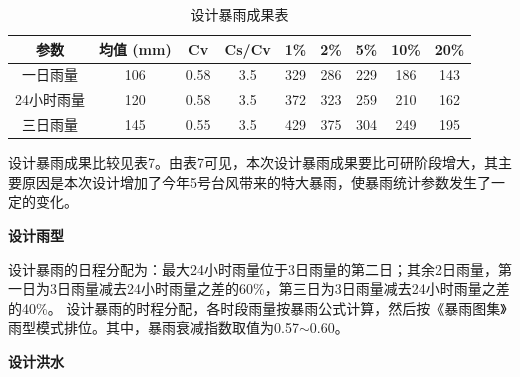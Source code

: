 \documentclass[UTF8, a4paper, 12pt]{ctexart} %
\begin{document}
\begin{table}[h]
    \centering
    \caption{设计暴雨成果表}
    \begin{tabular}{|c|c|c|c|c|c|c|c|c|}
        \hline
        参数 & 均值 (mm) & Cv & Cs/Cv & 1\% & 2\% & 5\% & 10\% & 20\% \\ \hline
        一日雨量 & 106 & 0.58 & 3.5 & 329 & 286 & 229 & 186 & 143 \\ \hline
        24小时雨量 & 120 & 0.58 & 3.5 & 372 & 323 & 259 & 210 & 162 \\ \hline
        三日雨量 & 145 & 0.55 & 3.5 & 429 & 375 & 304 & 249 & 195 \\ \hline
    \end{tabular}
    \label{tab:design_rainfall_results}
\end{table}
设计暴雨成果比较见表7。由表7可见，本次设计暴雨成果要比可研阶段增大，其主要原因是本次设计增加了今年5号台风带来的特大暴雨，使暴雨统计参数发生了一定的变化。
\begin{table}[h]
    \centering
    \caption{设计暴雨成果比较表}
    \label{tab:design_rainfall_comparison}
\end{table}

\par \textbf{设计雨型}
\par
设计暴雨的日程分配为：最大24小时雨量位于3日雨量的第二日；其余2日雨量，第一日为3日雨量减去24小时雨量之差的60\%，第三日为3日雨量减去24小时雨量之差的40\%。
设计暴雨的时程分配，各时段雨量按暴雨公式计算，然后按《暴雨图集》雨型模式排位。其中，暴雨衰减指数取值为0.57$\sim$0.60。
\par \textbf{设计洪水}
\end{document}
